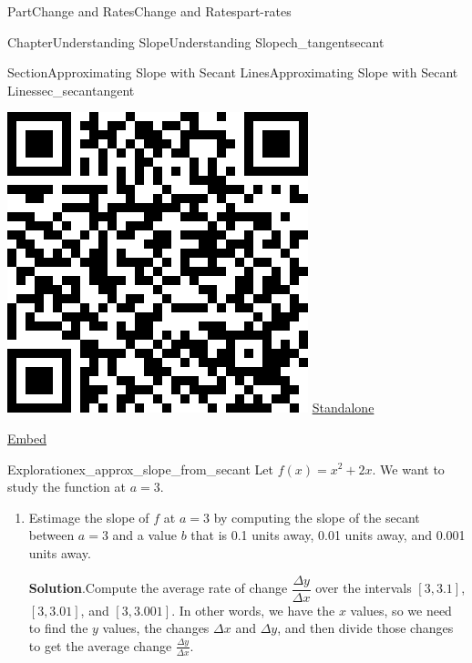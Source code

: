 \documentclass{tufte-book}
\newcommand{\blocktitlefont}{\relax}
\numberwithin{equation}{chapter}
\begin{document}
\begin{partptx}{Part}{Change and Rates}{}{Change and Rates}{}{}{part-rates}
\begin{chapterptx}{Chapter}{Understanding Slope}{}{Understanding Slope}{}{}{ch_tangentsecant}
\begin{sectionptx}{Section}{Approximating Slope with Secant Lines}{}{Approximating Slope with Secant Lines}{}{}{sec_secantangent}
\begin{sidebyside}{2}{0.075}{0.075}{0.17}
\begin{sbspanel}{0.21}
\includegraphics[width=\linewidth]{generated/qrcode/sec_secantangent-5.png}
\href{http://webwork.bridgew.edu/oer/functions_at_work/sec_secantangent-5.html}{Standalone}%
\par
\href{http://webwork.bridgew.edu/oer/functions_at_work/sec_secantangent-5-if.html}{Embed}%
\end{sbspanel}%
\end{sidebyside}%
\begin{exploration}{Exploration}{}{ex_approx_slope_from_secant}%
Let \(f(x) = x^2 + 2x\).  We want to study the function at \(a=3\).%
\begin{enumerate}[font=\bfseries,label=(\alph*),ref=\alph*]%
\item{}Estimage the slope of \(f\) at \(a=3\) by computing the slope of the secant between \(a=3\) and a value \(b\) that is 0.1 units away, 0.01 units away, and 0.001 units away.%
\par\smallskip%
\noindent\textbf{\blocktitlefont Solution}.\hypertarget{ex_approx_slope_from_secant-2-2}{}\quad{}Compute the average rate of change \(\dfrac{\Delta y}{\Delta x}\) over the intervals \([3,3.1]\), \([3,3.01]\), and \([3,3.001]\). In other words, we have the \(x\) values, so we need to find the \(y\) values, the changes \(\Delta x\) and \(\Delta y\), and then divide those changes to get the average change \(\frac{\Delta y}{\Delta x}\).%

\end{enumerate}
\end{exploration}
\end{sectionptx}
\end{chapterptx}
\end{partptx}
\end{document}
